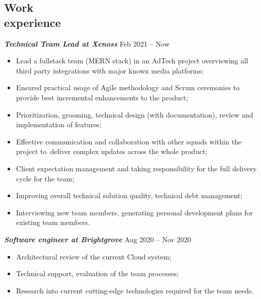 \documentclass[margin, 10pt]{res} %
\begin{document}
\begin{resume}
\section{Work\\ experience}

{\sl \bf Technical Team Lead at Xenoss } \hfill Feb 2021 -- Now
\vspace{3px}
\begin{itemize}
 \item Lead a fullstack team (MERN stack) in an AdTech project overviewing all third party integrations with major known media platforms;
 \item Ensured practical usage of Agile methodology and Scrum ceremonies to provide best incremental enhancements to the product;
 \item Prioritization, grooming, technical design (with documentation), review and implementation of features;
 \item Effective communication and collaboration with other squads within the project to~deliver complex updates across the whole product;
 \item Client expectation management and taking responsibility for the full delivery cycle for the team;
 \item Improving overall technical solution quality, technical debt management;
 \item Interviewing new team members, generating personal development plans for existing team members.
\end{itemize}

{\sl \bf Software engineer at Brightgrove } \hfill Aug 2020 -- Nov 2020
\vspace{3px}
\begin{itemize}
 \item Architectural review of the current Cloud system;
 \item Technical support, evaluation of the team processes;
 \item Research into current cutting-edge technologies required for the team needs.
\end{itemize}


\end{resume}
\end{document}
